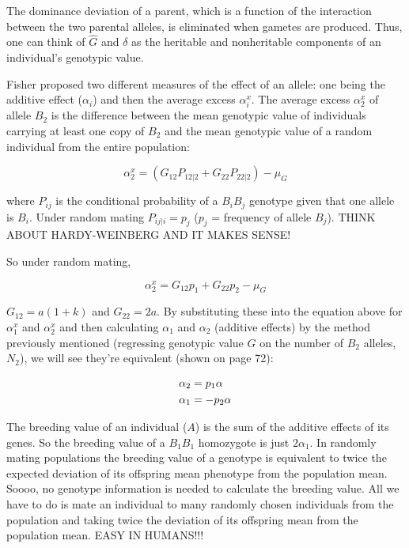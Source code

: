 \documentclass[
]{book}
\begin{document}
The dominance deviation of a parent, which is a function of the interaction between the two parental alleles, is eliminated when gametes are produced. Thus, one can think of \(\hat{G}\) and \(\delta\) as the heritable and nonheritable components of an individual's genotypic value.

Fisher proposed two different measures of the effect of an allele: one being the additive effect (\(\alpha_i\)) and then the average excess \(\alpha^x_i\). The average excess \(\alpha^x_2\) of allele \(B_2\) is the difference between the mean genotypic value of individuals carrying at least one copy of \(B_2\) and the mean genotypic value of a random individual from the entire population:

\begin{equation}
  \alpha^x_2 = (G_{12}P_{12|2} + G_{22}P_{22|2}) - \mu_G
  \label{eq:average-excess-effect}  
\end{equation}

where \(P_{ij}\) is the conditional probability of a \(B_iB_j\) genotype given that one allele is \(B_i\). Under random mating \(P_{ij|i} = p_j\) (\(p_j\) = frequency of allele \(B_j\)). THINK ABOUT HARDY-WEINBERG AND IT MAKES SENSE!

So under random mating,

\begin{equation}
  \alpha^x_2 = G_{12}p_1 + G_{22}p_2 - \mu_G
  \label{eq:average-excess-effect2}
\end{equation}

\(G_{12} = a(1+k)\) and \(G_{22} = 2a\). By substituting these into the equation above for \(\alpha^x_1\) and \(\alpha^x_2\) and then calculating \(\alpha_1\) and \(\alpha_2\) (additive effects) by the method previously mentioned (regressing genotypic value \(G\) on the number of \(B_2\) alleles, \(N_2\)), we will see they're equivalent (shown on page 72):

\begin{align}
  \alpha_2 &= p_1\alpha \notag \\
  \alpha_1 &= -p_2\alpha
\end{align}

The breeding value of an individual (\(A\)) is the sum of the additive effects of its genes. So the breeding value of a \(B_1B_1\) homozygote is just \(2\alpha_1\). In randomly mating populations the breeding value of a genotype is equivalent to twice the expected deviation of its offspring mean phenotype from the population mean. Soooo, no genotype information is needed to calculate the breeding value. All we have to do is mate an individual to many randomly chosen individuals from the population and taking twice the deviation of its offspring mean from the population mean. EASY IN HUMANS!!!
\end{document}
